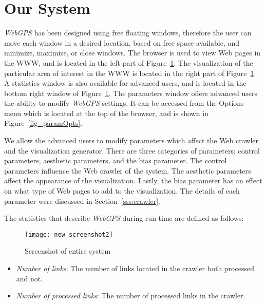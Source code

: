 \documentclass[10pt,psfig]{article}
\begin{document}
{\section{Our System}
\label{se:system}

{\em WebGPS} has been designed using free floating windows, therefore the user can move each window in a desired location, based on free space available, and minimize, maximize, or close windows.
The browser is used to view Web pages in the WWW, and is located in the left part of Figure~\ref{fig_systemshot2}.
The visualization of the particular area of interest in the WWW is located in the right part of Figure~\ref{fig_systemshot2}.
A statistics window is also available for advanced users, and is located in the bottom right window of Figure~\ref{fig_systemshot2}.
The parameters window offers advanced users the ability to modify {\em WebGPS} settings.
It can be accessed from the Options menu which is located at the top of the browser, and is shown in Figure~\ref{fig_paramOpts}.

We allow the advanced users to modify parameters which affect the Web crawler and the visualization generator.
There are three categories of parameters: control parameters, aesthetic parameters, and the bias parameter.
The control parameters influence the Web crawler of the system.
The aesthetic parameters affect the appearance of the visualization.
Lastly, the bias parameter has an effect on what type of Web pages to add to the visualization.
The details of each parameter were discussed in Section~\ref{sss:crawler}.

The statistics that describe {\em WebGPS} during run-time are defined as follows:

\begin{figure}[t]
\centering
\texttt{[image: new\_screenshot2]}
\caption{Screenshot of entire system}
\label{fig_systemshot2}
\end{figure}

\begin{itemize}

\item {\em Number of links}: The number of links located in the crawler both processed and not.

\item {\em Number of processed links}: The number of processed links in the crawler.


\end{itemize}}
\end{document}
